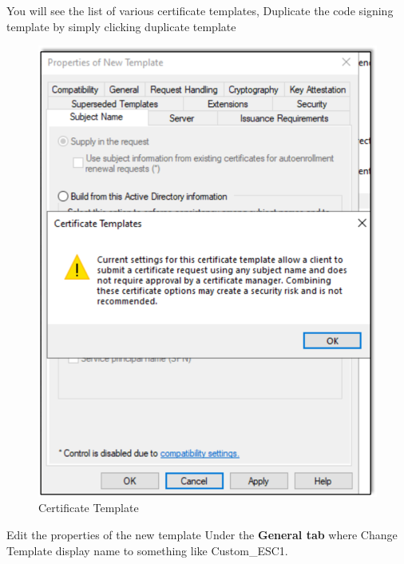 You will see the list of various certificate templates, Duplicate the code signing template by simply clicking duplicate template

\begin{figure}
    \centering
    \includegraphics[width=0.75\linewidth]{certtemp.png}
    \caption{Certificate Template}
    \label{fig:placeholder}
\end{figure}


Edit the properties of the new template Under the \textbf{General tab} where Change Template display name to something like Custom\_ESC1.

